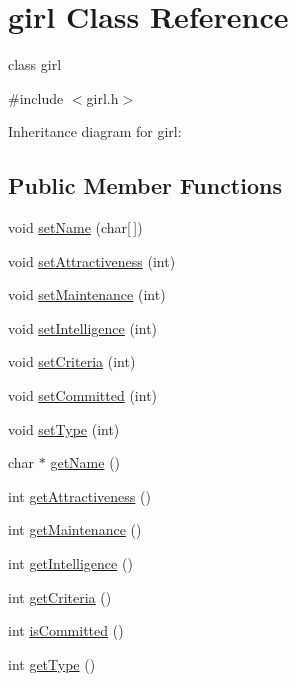 \hypertarget{classgirl}{}\section{girl Class Reference}
\label{classgirl}


class girl  




{\ttfamily \#include $<$girl.\+h$>$}



Inheritance diagram for girl\+:
\subsection*{Public Member Functions}
\begin{DoxyCompactItemize}
\item 
void \hyperlink{classgirl_a14ab218dcadb93f6b1a76243d4f29f54}{set\+Name} (char\mbox{[}$\,$\mbox{]})
\item 
void \hyperlink{classgirl_a631115234a7e2ca7b497856e32c4ee7b}{set\+Attractiveness} (int)
\item 
void \hyperlink{classgirl_ad7cae120240fcc3a76c135f27accc602}{set\+Maintenance} (int)
\item 
void \hyperlink{classgirl_a3a4c341525032ef1a9a43572ab4ab370}{set\+Intelligence} (int)
\item 
void \hyperlink{classgirl_a7862bad2b048e7c66276ffce16f6473e}{set\+Criteria} (int)
\item 
void \hyperlink{classgirl_abe6157cdf1704c7a6812ea7dd6f21247}{set\+Committed} (int)
\item 
void \hyperlink{classgirl_a85b694210361853ec1fee3f232491009}{set\+Type} (int)
\item 
char $\ast$ \hyperlink{classgirl_a41e2f9df2102a8844056a91684f6ef46}{get\+Name} ()
\item 
int \hyperlink{classgirl_a1527388fa94cbc272a39585fbd4f6a9a}{get\+Attractiveness} ()
\item 
int \hyperlink{classgirl_a051010e5dba6b51aa26a4cb0262ad014}{get\+Maintenance} ()
\item 
int \hyperlink{classgirl_a2eaa376a2b7b0f9ef533e97c785559b8}{get\+Intelligence} ()
\item 
int \hyperlink{classgirl_a2c8edbf4f1acd77a26119c2febaeff41}{get\+Criteria} ()
\item 
int \hyperlink{classgirl_a14b74b7000edbf90c6d1e90ba8693535}{is\+Committed} ()
\item 
int \hyperlink{classgirl_a404ebe06f540d756e03532bf604fda23}{get\+Type} ()
\end{DoxyCompactItemize}


